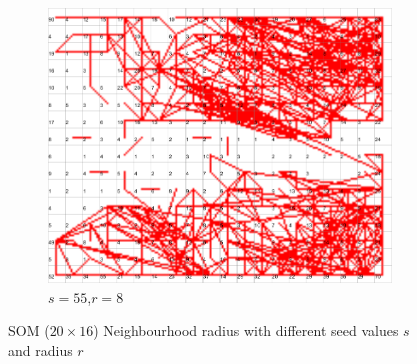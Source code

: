 \documentclass{acm_proc_article-sp}
\begin{document}
\begin{figure}
    \begin{subfigure}[b]{0.30\linewidth}
        \includegraphics[width=\linewidth]{img/wine-newmid-radius-neighbourhood-graph--r-08-seed-55}
        \caption{$s=55$,$r=8$}
    \end{subfigure}
    \caption{SOM ($20\times16$) Neighbourhood radius with different seed values $s$ and radius $r$}
    \label{fig:wine-newmid-radius-neighbourhood-graph--r-08-seed}
\end{figure}
\end{document}
